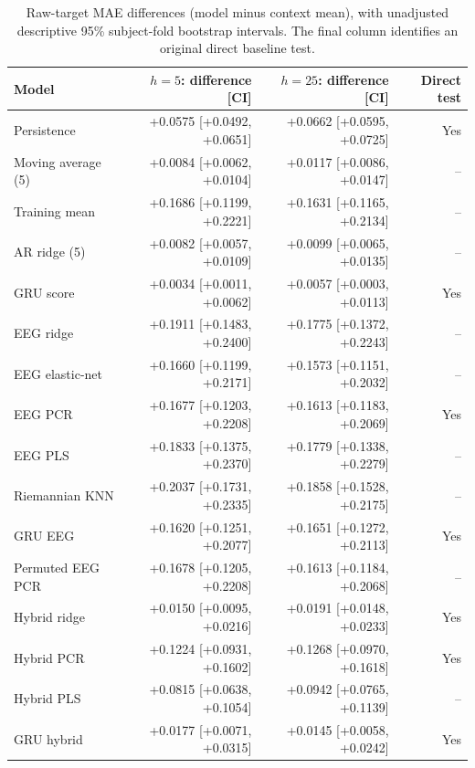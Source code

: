 \begin{table}[!ht]
\centering
\small
\setlength{\tabcolsep}{5pt}
\renewcommand{\arraystretch}{1.1}
\caption{Raw-target MAE differences (model minus context mean), with unadjusted descriptive 95\% subject-fold bootstrap intervals. The final column identifies an original direct baseline test.}
\label{tab:supp_deltas_raw}
\begin{tabular}{lrrr}
\toprule
Model & $h=5$: difference [CI] & $h=25$: difference [CI] & Direct test \\
\midrule
Persistence & +0.0575 [+0.0492, +0.0651] & +0.0662 [+0.0595, +0.0725] & Yes \\
Moving average (5) & +0.0084 [+0.0062, +0.0104] & +0.0117 [+0.0086, +0.0147] & -- \\
Training mean & +0.1686 [+0.1199, +0.2221] & +0.1631 [+0.1165, +0.2134] & -- \\
AR ridge (5) & +0.0082 [+0.0057, +0.0109] & +0.0099 [+0.0065, +0.0135] & -- \\
GRU score & +0.0034 [+0.0011, +0.0062] & +0.0057 [+0.0003, +0.0113] & Yes \\
EEG ridge & +0.1911 [+0.1483, +0.2400] & +0.1775 [+0.1372, +0.2243] & -- \\
EEG elastic-net & +0.1660 [+0.1199, +0.2171] & +0.1573 [+0.1151, +0.2032] & -- \\
EEG PCR & +0.1677 [+0.1203, +0.2208] & +0.1613 [+0.1183, +0.2069] & Yes \\
EEG PLS & +0.1833 [+0.1375, +0.2370] & +0.1779 [+0.1338, +0.2279] & -- \\
Riemannian KNN & +0.2037 [+0.1731, +0.2335] & +0.1858 [+0.1528, +0.2175] & -- \\
GRU EEG & +0.1620 [+0.1251, +0.2077] & +0.1651 [+0.1272, +0.2113] & Yes \\
Permuted EEG PCR & +0.1678 [+0.1205, +0.2208] & +0.1613 [+0.1184, +0.2068] & -- \\
Hybrid ridge & +0.0150 [+0.0095, +0.0216] & +0.0191 [+0.0148, +0.0233] & Yes \\
Hybrid PCR & +0.1224 [+0.0931, +0.1602] & +0.1268 [+0.0970, +0.1618] & Yes \\
Hybrid PLS & +0.0815 [+0.0638, +0.1054] & +0.0942 [+0.0765, +0.1139] & -- \\
GRU hybrid & +0.0177 [+0.0071, +0.0315] & +0.0145 [+0.0058, +0.0242] & Yes \\
\bottomrule
\end{tabular}
\end{table}
